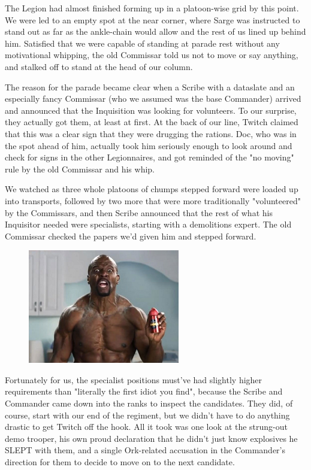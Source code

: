 The Legion had almost finished forming up in a platoon-wise grid by this point. 
We were led to an empty spot at the near corner, where Sarge was instructed to stand out as far as the ankle-chain would allow and the rest of us lined up behind him. 
Satisfied that we were capable of standing at parade rest without any motivational whipping, the old Commissar told us not to move or say anything, and stalked off to stand at the head of our column.

The reason for the parade became clear when a Scribe with a dataslate and an especially fancy Commissar (who we assumed was the base Commander) arrived and announced that the Inquisition was looking for volunteers. 
To our surprise, they actually got them, at least at first. 
At the back of our line, Twitch claimed that this was a clear sign that they were drugging the rations. 
Doc, who was in the spot ahead of him, actually took him seriously enough to look around and check for signs in the other Legionnaires, and got reminded of the "no moving" rule by the old Commissar and his whip. 


We watched as three whole platoons of chumps stepped forward were loaded up into transports, followed by two more that were more traditionally "volunteered" by the Commissars, and then Scribe announced that the rest of what his Inquisitor needed were specialists, starting with a demolitions expert. 
The old Commissar checked the papers we'd given him and stepped forward.

\begin{figure}
	\begin{center}
		\includegraphics[width=\figwidth]{pics/21/8.png}
	\end{center}
\end{figure}
Fortunately for us, the specialist positions must've had slightly higher requirements than "literally the first idiot you find", because the Scribe and Commander came down into the ranks to inspect the candidates. 
They did, of course, start with our end of the regiment, but we didn't have to do anything drastic to get Twitch off the hook. 
All it took was one look at the strung-out demo trooper, his own proud declaration that he didn't just know explosives he SLEPT with them, and a single Ork-related accusation in the Commander's direction for them to decide to move on to the next candidate.

